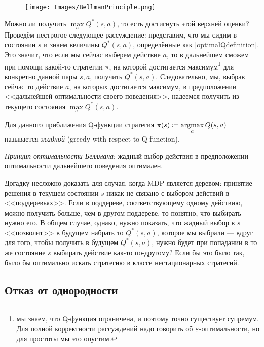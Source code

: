 \begin{figure}
\vspace{-0.3cm}
\centering
\texttt{[image: Images/BellmanPrinciple.png]}
\vspace{-0.5cm}
\end{figure}

Можно ли получить $\max\limits_{a} Q^*(s, a)$, то есть достигнуть этой верхней оценки? Проведём нестрогое следующее рассуждение: представим, что мы сидим в состоянии $s$ и знаем величины $Q^*(s, a)$, определённые как \eqref{optimalQdefinition}. Это значит, что если мы сейчас выберем действие $a$, то в дальнейшем сможем при помощи какой-то стратегии $\pi$, на которой достигается максимум\footnote{мы знаем, что Q-функция ограничена, и поэтому точно существует супремум. Для полной корректности рассуждений надо говорить об $\varepsilon$-оптимальности, но для простоты мы это опустим.} для конкретно данной пары $s, a$, получить $Q^*(s, a)$. Следовательно, мы, выбрав сейчас то действие $a$, на которых достигается максимум, в предположении <<дальнейшей оптимальности своего поведения>>, надеемся получить из текущего состояния $\max\limits_a Q^*(s, a)$.

\begin{definition}\label{greedy}
Для данного приближения Q-функции стратегия $\pi(s) \coloneqq \mathop{\mathrm{argmax}}\limits_a Q(s, a)$ называется \emph{жадной} (greedy with respect to Q-function).
\end{definition}

\begin{definition}
\emph{Принцип оптимальности Беллмана}: жадный выбор действия в предположении оптимальности дальнейшего поведения оптимален.
\end{definition}

Догадку несложно доказать для случая, когда MDP является деревом: принятие решения в текущем состоянии $s$ никак не связано с выбором действий в <<поддеревьях>>. Если в поддереве, соответствующему одному действию, можно получить больше, чем в другом поддереве, то понятно, что выбирать нужно его. В общем случае, однако, нужно показать, что жадный выбор в $s$ <<позволит>> в будущем набрать то $Q^*(s, a)$, которое мы выбрали --- вдруг для того, чтобы получить в будущем $Q^*(s, a)$, нужно будет при попадании в то же состояние $s$ выбирать действие как-то по-другому? Если бы это было так, было бы оптимально искать стратегию в классе нестационарных стратегий.

\subsection{Отказ от однородности}

